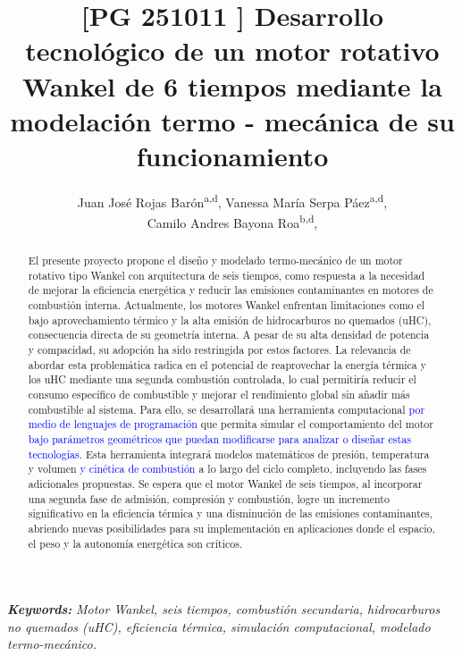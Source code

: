 \documentclass{LS}
\title{\LARGE[PG 251011 ] Desarrollo tecnol\'ogico de un motor rotativo Wankel de 6 tiempos mediante la modelaci\'on termo - mec\'anica de su funcionamiento}
\author{
    Juan Jos\'e Rojas Bar\'on\textsuperscript{a,d},
    Vanessa Mar\'ia Serpa P\'aez\textsuperscript{a,d},\\
    Camilo Andres Bayona Roa\textsuperscript{b,d},
}
\begin{document}
\maketitle

\noindent\hrulefill
\vspace{-1em} 
\begin{abstract}

El presente proyecto propone el diseño y modelado termo-mecánico de un motor rotativo tipo Wankel con arquitectura de seis tiempos, como respuesta a la necesidad de mejorar la eficiencia energética y reducir las emisiones contaminantes en motores de combustión interna. Actualmente, los motores Wankel enfrentan limitaciones como el bajo aprovechamiento térmico y la alta emisión de hidrocarburos no quemados (uHC), consecuencia directa de su geometría interna. A pesar de su alta densidad de potencia y compacidad, su adopción ha sido restringida por estos factores. La relevancia de abordar esta problemática radica en el potencial de reaprovechar la energía térmica y los uHC mediante una segunda combustión controlada, lo cual permitiría reducir el consumo específico de combustible y mejorar el rendimiento global sin añadir más combustible al sistema. Para ello, se desarrollará una herramienta computacional \textcolor{blue}{por medio de lenguajes de programación} que permita simular el comportamiento del motor \textcolor{blue}{bajo parámetros geométricos que puedan modificarse para analizar o diseñar estas tecnologías.} Esta herramienta integrará modelos matemáticos de presión, temperatura y volumen \textcolor{blue}{y cinética de combustión} a lo largo del ciclo completo, incluyendo las fases adicionales propuestas. Se espera que el motor Wankel de seis tiempos, al incorporar una segunda fase de admisión, compresión y combustión, logre un incremento significativo en la eficiencia térmica y una disminución de las emisiones contaminantes, abriendo nuevas posibilidades para su implementación en aplicaciones donde el espacio, el peso y la autonomía energética son críticos.

\end{abstract}
\vspace{-1em} 

\begin{center}
\textbf{\textit{\fontsize{8}{10}\selectfont Keywords:}} \textit{\fontsize{8}{10}\selectfont   Motor Wankel, seis tiempos, combustión secundaria, hidrocarburos no quemados (uHC), eficiencia térmica, simulación computacional, modelado termo-mecánico. }
\end{center}
\end{document}
